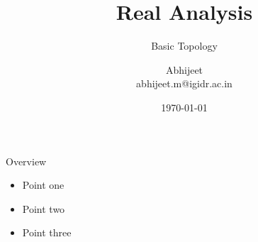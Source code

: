 \documentclass{beamer}
\title[Short Title]{Real Analysis}
\subtitle{Basic Topology}
\author[Author Short]{Abhijeet \\ \small abhijeet.m@igidr.ac.in}
\institute[Inst Short]{Mathematics for Economists \\  \\ IGIDR}
\date{\today}
\begin{document}
\begin{frame}[plain]
  \titlepage
\end{frame}

\begin{frame}{Overview}
  \begin{itemize}
    \item Point one
    \item Point two
    \item Point three
  \end{itemize}
\end{frame}
\end{document}
